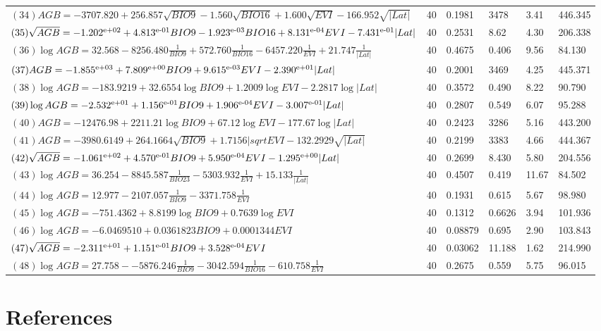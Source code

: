 \documentclass[authoryear]{elsarticle}   	%
\begin{document}
\begin{table}[htbp]
\begin{tabular}{p{8cm}p{0.5cm}p{1.0cm}p{1.0cm}p{1.0cm}p{1.0cm}}
$(34)AGB=-3707.820+256.857\sqrt{BIO9}-1.560\sqrt{BIO16}+1.600\sqrt{EVI}-166.952\sqrt{|Lat|}$&40&0.1981&3478&3.41&446.345\\
$(35)\sqrt{AGB}=-1.202\textsuperscript{e+02}+4.813\textsuperscript{e-01}BIO9-1.923\textsuperscript{e-03}BIO16+8.131\textsuperscript{e-04}EVI-7.431\textsuperscript{e-01}|Lat|$&40&0.2531&8.62&4.30&206.338\\
$(36)\log{AGB}=32.568-8256.480\frac{1}{BIO9}+572.760\frac{1}{BIO16}-6457.220\frac{1}{EVI}+21.747\frac{1}{|Lat|}$&40&0.4675&0.406&9.56& 84.130\\ 
$(37)AGB=-1.855\textsuperscript{e+03}+7.809\textsuperscript{e+00}BIO9+9.615\textsuperscript{e-03}EVI-2.390\textsuperscript{e+01}|Lat|$&40&0.2001&3469&4.25&445.371\\
$(38)\log{AGB}=-183.9219+32.6554\log{BIO9}+1.2009\log{EVI}-2.2817\log{|Lat|}$&40&0.3572&0.490&8.22&90.790\\
$(39)\log{AGB}=-2.532\textsuperscript{e+01}+1.156\textsuperscript{e-01}BIO9+1.906\textsuperscript{e-04}EVI-3.007\textsuperscript{e-01}|Lat|$&40&0.2807&0.549&6.07&95.288\\
$(40)AGB=-12476.98+2211.21\log{BIO9}+67.12\log{EVI}-177.67\log{|Lat|}$&40&0.2423&3286&5.16&443.200\\ 
$(41)AGB=-3980.6149+264.1664\sqrt{BIO9}+1.7156|sqrt{EVI}-132.2929\sqrt{|Lat|}$&40&0.2199&3383&4.66&444.367\\
$(42)\sqrt{AGB}=-1.061\textsuperscript{e+02}+4.570\textsuperscript{e-01}BIO9+5.950\textsuperscript{e-04}EVI-1.295\textsuperscript{e+00}|Lat|$&40&0.2699&8.430&5.80&204.556\\
$(43)\log{AGB}=36.254-8845.587\frac{1}{BIO23}-5303.932\frac{1}{EVI}+15.133\frac{1}{|Lat|}$&40&0.4507&0.419&11.67&84.502\\
$(44)\log{AGB}=12.977-2107.057\frac{1}{BIO9}-3371.758\frac{1}{EVI}$ &40&0.1931&0.615&5.67&98.980\\
$(45)\log{AGB}=-751.4362+8.8199\log{BIO9}+0.7639\log{EVI}$&40&0.1312&0.6626&3.94&101.936\\
$(46)\log{AGB}=-6.0469510+0.0361823BIO9+0.0001344EVI$&40&0.08879&0.695&2.90&103.843\\
$(47)\sqrt{AGB}=-2.311\textsuperscript{e+01}+1.151\textsuperscript{e-01}BIO9+3.528\textsuperscript{e-04}EVI$&40&0.03062&11.188&1.62&214.990\\   
$(48)\log{AGB}=27.758--5876.246\frac{1}{BIO9}-3042.594\frac{1}{BIO16}-610.758\frac{1}{EVI}$ &40&0.2675&0.559&5.75&96.015\\
      \bottomrule
  \end{tabular}
   \label{tab:models}
\end{table}

\clearpage

\section*{References}


%
\end{document}
